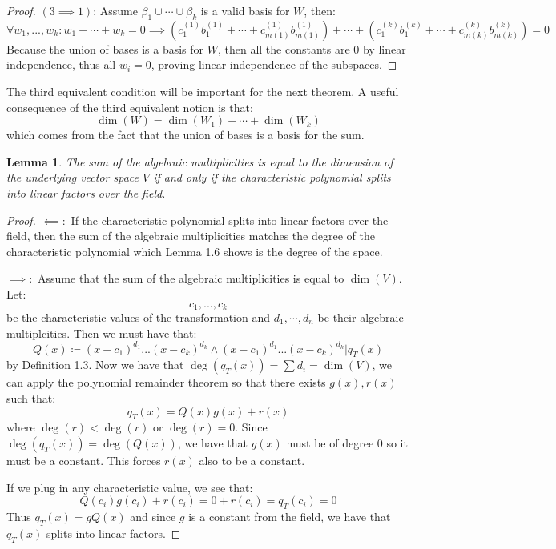 \documentclass[10pt,letterpaper]{article} %
\newtheorem{lem}{Lemma}[section]
\begin{document}
\begin{proof}
$(3 \implies 1)$: Assume $\beta_1 \cup \cdots \cup \beta_k$ is a valid basis for $W$, then:
\begin{equation*}
\forall w_1, ..., w_k: w_1 + \cdots + w_k = 0 \implies (c_1^{(1)}b_1^{(1)} + \cdots + c_{m(1)}^{(1)}b_{m(1)}^{(1)}) + \cdots + (c_1^{(k)}b_1^{(k)} + \cdots + c_{m(k)}^{(k)}b_{m(k)}^{(k)}) = 0
\end{equation*}
Because the union of bases is a basis for $W$, then all the constants are $0$ by linear independence, thus all $w_i = 0$, proving linear independence of the subspaces.
\end{proof}
The third equivalent condition will be important for the next theorem. A useful consequence of the third equivalent notion is that:
\begin{equation*}
\dim(W) = \dim(W_1) + \cdots + \dim(W_k)
\end{equation*}
which comes from the fact that the union of bases is a basis for the sum.

\begin{lem}
The sum of the algebraic multiplicities is equal to the dimension of the underlying vector space $V$ if and only if the characteristic polynomial splits
into linear factors over the field.
\end{lem}
\begin{proof}
$\impliedby:$ If the characteristic polynomial splits into linear factors over the field, then the sum of the algebraic multiplicities matches the degree of
the characteristic polynomial which Lemma 1.6 shows is the degree of the space.

$\implies:$ Assume that the sum of the algebraic multiplicities is equal to $\dim(V)$. Let:
\begin{equation*}
c_1, ..., c_k
\end{equation*}
be the characteristic values of the transformation and $d_1, \cdots, d_n$ be their algebraic multiplcities. Then we must have that:
\begin{equation*}
Q(x) \coloneq (x-c_1)^{d_1}...(x-c_k)^{d_k} \land (x-c_1)^{d_1}...(x-c_k)^{d_k} | q_T(x)
\end{equation*}
by Definition 1.3. Now we have that $\deg(q_T(x)) = \sum d_i = \dim(V)$, we can apply the polynomial remainder theorem so that there exists $g(x), r(x)$ such that:
\begin{equation*}
q_T(x) = Q(x)g(x) + r(x)
\end{equation*}
where $\deg(r) < \deg(r)$ or $\deg(r) = 0$. Since $\deg(q_T(x)) = \deg(Q(x))$, we have that $g(x)$ must be of degree $0$ so it must be a constant. This forces $r(x)$ also to be a constant.

If we plug in any characteristic value, we see that:
\begin{equation*}
Q(c_i)g(c_i) + r(c_i) = 0 + r(c_i) = q_T(c_i) = 0
\end{equation*}
Thus $q_T(x) = gQ(x)$ and since $g$ is a constant from the field, we have that $q_T(x)$ splits into linear factors.
\end{proof}
\end{document}
